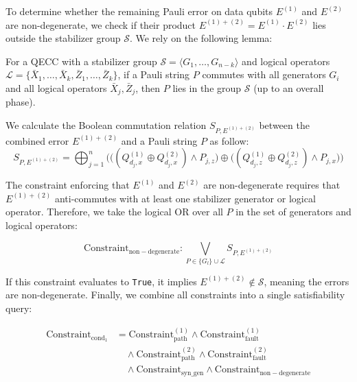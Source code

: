 \documentclass[acmsmallw,review]{acmart}
\begin{document}
To determine whether the remaining Pauli error on data qubits $E^{(1)}$ and $E^{(2)}$ are non-degenerate, we check if their product $E^{(1)+(2)} = E^{(1)} \cdot E^{(2)}$ lies outside the stabilizer group $\mathcal{S}$. We rely on the following lemma:

\begin{lemma}
For a QECC with a stabilizer group $\mathcal{S} = \langle G_1, \dots, G_{n-k} \rangle$ and logical operators $\mathcal{L} = \{\bar{X}_1, \dots, \bar{X}_k, \bar{Z}_1, \dots, \bar{Z}_k\}$, if a Pauli string $P$ commutes with all generators $G_i$ and all logical operators $\bar{X}_j, \bar{Z}_j$, then $P$ lies in the group $\mathcal{S}$ (up to an overall phase).
\end{lemma}

We calculate the Boolean commutation relation $S_{P, E^{(1)+(2)}}$ between the combined error $E^{(1)+(2)}$ and a Pauli string $P$ as follow:
\begin{equation}
S_{P, E^{(1)+(2)}} = \bigoplus_{j=1}^{n} \Big( \big( (Q^{(1)}_{d_j, x} \oplus Q^{(2)}_{d_j, x}) \land P_{j,z} \big) \oplus \big( (Q^{(1)}_{d_j, z} \oplus Q^{(2)}_{d_j, z}) \land P_{j,x} \big) \Big)
\end{equation}

The constraint enforcing that $E^{(1)}$ and $E^{(2)}$ are non-degenerate requires that $E^{(1)+(2)}$ anti-commutes with at least one stabilizer generator or logical operator. Therefore, we take the logical OR over all $P$ in the set of generators and logical operators:

\begin{equation}
\mathrm{Constraint}_{\mathrm{non-degenerate}} : \bigvee_{P \in \{G_l\} \cup \mathcal{L}} S_{P, E^{(1)+(2)}}
\end{equation}

If this constraint evaluates to \texttt{True}, it implies $E^{(1)+(2)}  \notin \mathcal{S}$, meaning the errors are non-degenerate. Finally, we combine all constraints into a single satisfiability query:

\begin{equation}
\begin{aligned}
\mathrm{Constraint}_{\mathrm{cond_1}} &= \mathrm{Constraint}_{\mathrm{path}}^{(1)} \land \mathrm{Constraint}_{\mathrm{fault}}^{(1)} \\
&\quad \land \mathrm{Constraint}_{\mathrm{path}}^{(2)} \land \mathrm{Constraint}_{\mathrm{fault}}^{(2)} \\
&\quad \land \mathrm{Constraint}_{\mathrm{syn\_gen}} \land \mathrm{Constraint}_{\mathrm{non-degenerate}} 
\end{aligned}
\end{equation}
\end{document}
